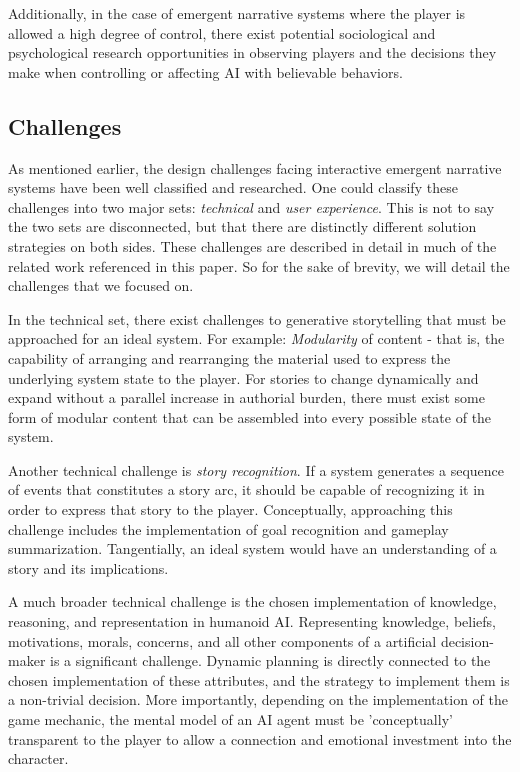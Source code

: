 \documentclass[letterpaper, 10 pt, conference]{ieeeconf}  %
\begin{document}
Additionally, in the case of emergent narrative systems where the player is allowed a high degree of control, there exist potential sociological and psychological research opportunities in observing players and the decisions they make when controlling or affecting AI with believable behaviors.
\subsection{Challenges}
	As mentioned earlier, the design challenges facing interactive emergent narrative systems have been well classified and researched. One could classify these challenges into two major sets: \emph{technical} and \emph{user experience}. This is not to say the two sets are disconnected, but that there are distinctly different solution strategies on both sides. These challenges are described in detail in much of the related work referenced in this paper. So for the sake of brevity, we will detail the challenges that we focused on.
	
	In the technical set, there exist challenges to generative storytelling that must be approached for an ideal system. For example: \emph{Modularity} of content - that is, the capability of arranging and rearranging the material used to express the underlying system state to the player. For stories to change dynamically and expand without a parallel increase in authorial burden, there must exist some form of modular content that can be assembled into every possible state of the system.
	
	Another technical challenge is \emph{story recognition}. If a system generates a sequence of events that constitutes a story arc, it should be capable of recognizing it in order to express that story to the player. Conceptually, approaching this challenge includes the implementation of goal recognition and gameplay summarization. Tangentially, an ideal system would have an understanding of a story and its implications. 
	
	A much broader technical challenge is the chosen implementation of knowledge, reasoning, and representation in humanoid AI. Representing knowledge, beliefs, motivations, morals, concerns, and all other components of a artificial decision-maker is a significant challenge. Dynamic planning is directly connected to the chosen implementation of these attributes, and the strategy to implement them is a non-trivial decision. More importantly, depending on the implementation of the game mechanic, the mental model of an AI agent must be 'conceptually' transparent to the player to allow a connection and emotional investment into the character.
	
\end{document}
